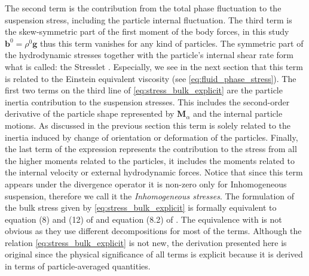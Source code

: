 The second term is the  contribution from the total phase fluctuation to the suspension stress, including the particle internal fluctuation. 
The third term is the skew-symmetric part of the first moment of the body forces, in this study $\textbf{b}^0 = \rho^0 \textbf{g}$ thus this term vanishes for any kind of particles. 
The symmetric part of the hydrodynamic stresses together with the particle's internal shear rate form what is called: the Stresslet \citep{pozrikidis1992boundary}. 
Especially, we see in the next section that this term is related to the Einstein equivalent viscosity (see \ref{eq:fluid_phase_stress}). 
The first two terms on the third line of \ref{eq:stress_bulk_explicit} are the particle inertia contribution to the suspension stresses. 
This includes the second-order derivative of the particle shape represented by $\textbf{M}_\alpha$ and the internal particle motions. 
As discussed in the previous section this term is solely related to the inertia induced by change of orientation or deformation of the particles. 
Finally, the last term of the expression represents the contribution to the stress from all the higher moments related to the particles, it includes the moments related to the internal velocity or external hydrodynamic forces.  
Notice that since this term appears under the divergence operator it is non-zero only for Inhomogeneous suspension, therefore we call it the \textit{Inhomogeneous stresses}. 
The formulation of the bulk stress given by \ref{eq:stress_bulk_explicit} is formally equivalent to equation (8) and (12) of \citet{lhuillier1996contribution} and equation (8.2) of \citet{zhang1997momentum}.
The equivalence with \citet{zhang1997momentum} is not obvious as they use different decompositions for most of the terms. 
Although the relation \ref{eq:stress_bulk_explicit} is not new, the derivation presented here is original since the physical significance of all terms is explicit because it is derived in terms of particle-averaged quantities.

    



